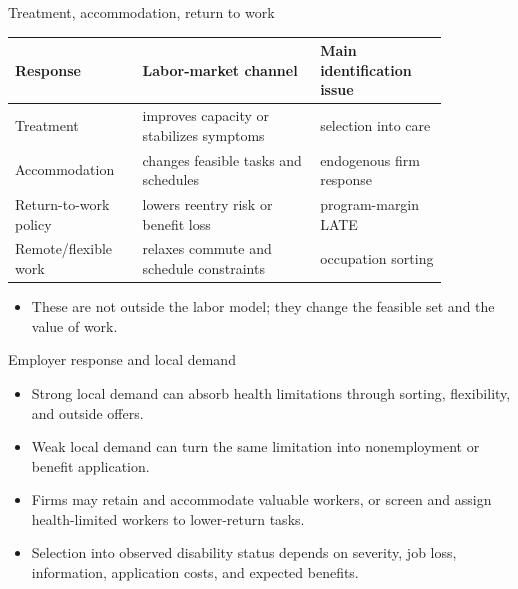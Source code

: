 \documentclass[aspectratio=169,11pt]{beamer}
\begin{document}
\begin{frame}{Treatment, accommodation, return to work}
\small
\begin{tabular}{p{0.24\linewidth} p{0.36\linewidth} p{0.26\linewidth}}
\toprule
Response & Labor-market channel & Main identification issue \\
\midrule
Treatment & improves capacity or stabilizes symptoms & selection into care \\
Accommodation & changes feasible tasks and schedules & endogenous firm response \\
Return-to-work policy & lowers reentry risk or benefit loss & program-margin LATE \\
Remote/flexible work & relaxes commute and schedule constraints & occupation sorting \\
\bottomrule
\end{tabular}
\vspace{0.35cm}
\begin{itemize}
    \item These are not outside the labor model; they change the feasible set and the value of work.
\end{itemize}
\end{frame}

\begin{frame}{Employer response and local demand}
\begin{itemize}
    \item Strong local demand can absorb health limitations through sorting, flexibility, and outside offers.
    \item Weak local demand can turn the same limitation into nonemployment or benefit application.
    \item Firms may retain and accommodate valuable workers, or screen and assign health-limited workers to lower-return tasks.
    \item Selection into observed disability status depends on severity, job loss, information, application costs, and expected benefits.
\end{itemize}
\end{frame}
\end{document}
